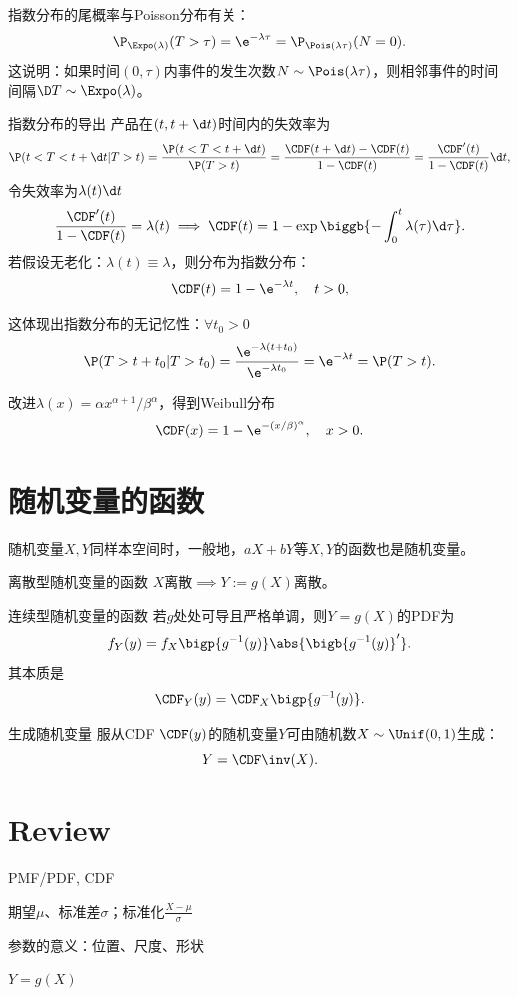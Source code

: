 \begin{corollary}
	指数分布的尾概率与Poisson分布有关：
	\[
		\P_{\Expo(\lambda)}(T>\tau)=\e^{-\lambda\tau}=\P_{\Pois(\lambda\tau)}(N=0).
	\]
	这说明：如果时间$(0,\tau)$内事件的发生次数$N\sim\Pois(\lambda\tau)$，则相邻事件的时间间隔$\D T\sim\Expo(\lambda)$。
\end{corollary}

\begin{example}{指数分布的导出}{}
	产品在$(t,t+\d t)$时间内的失效率为
	\[
		\P(t<T<t+\d t|T>t)=\frac{\P(t<T<t+\d t)}{\P(T>t)}=\frac{\CDF(t+\d t)-\CDF(t)}{1-\CDF(t)}=\frac{\CDF'(t)}{1-\CDF(t)}\d t,
	\]
	令失效率为$\lambda(t)\d t$
	\[
		\frac{\CDF'(t)}{1-\CDF(t)}=\lambda(t)\implies\CDF(t)=1-\exp\biggb{-\int_0^t\lambda(\tau)\d\tau}.
	\]
	若假设无老化：$\lambda(t)\equiv\lambda$，则分布为指数分布：
	\begin{equation}
		\CDF(t)=1-\e^{-\lambda t},\quad t>0,
	\end{equation}

	这体现出指数分布的无记忆性：$\forall t_0>0$
	\[
		\P(T>t+t_0|T>t_0)=\frac{\e^{-\lambda(t+t_0)}}{\e^{-\lambda t_0}}=\e^{-\lambda t}=\P(T>t).
	\]

	\tcblower
	
	改进$\lambda(x)=\alpha x^{\alpha+1}/\beta^\alpha$，得到Weibull分布
	\begin{equation}
		\label{eqn:Weibull CDF}
		\CDF(x)=1-\e^{-(x/\beta)^\alpha},\quad x>0.
	\end{equation}
\end{example}

\section{随机变量的函数}

随机变量$X,Y$同样本空间时，一般地，$aX+bY$等$X,Y$的函数也是随机变量。

\begin{theorem}
	{离散型随机变量的函数}{}
	$X$离散$\implies Y:=g(X)$离散。
\end{theorem}

\begin{theorem}{连续型随机变量的函数}{}
	若$g$处处可导且严格单调，则$Y=g(X)$的PDF为
	\begin{equation}
		f_Y(y)=f_X\bigp{g^{-1}(y)}\abs{\bigb{g^{-1}(y)}'}.
	\end{equation}
	其本质是
	\begin{equation}
		\CDF_Y(y)=\CDF_X\bigp{g^{-1}(y)}.
	\end{equation}
\end{theorem}
\begin{example}{生成随机变量}{}
	服从CDF $\CDF(y)$的随机变量$Y$可由随机数$X\sim\Unif(0,1)$生成：
	\begin{equation}
		Y=\CDF\inv(X).
	\end{equation}
\end{example}
\section*{Review}
\begin{compactenum}
	\item PMF/PDF, CDF
	\item 期望$\mu$、标准差$\sigma$；标准化$\frac{X-\mu}\sigma$
	\item 参数的意义：位置、尺度、形状
	\item $Y=g(X)$
\end{compactenum}